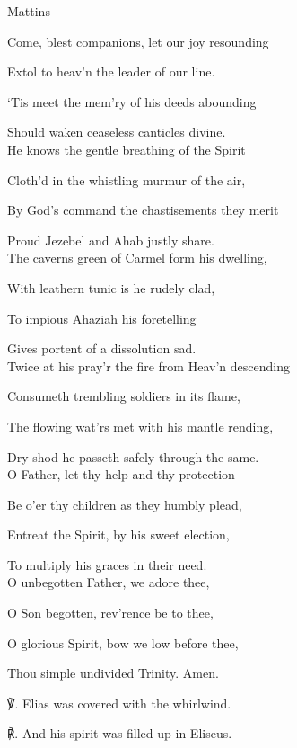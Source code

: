 \begin{paracol}{2}[]
\switchcolumn

\begin{inhead}
	Mattins
\end{inhead}
\begin{hangparas}{1.25em}{1}
Come, blest companions, let our joy resounding

Extol to heav'n the leader of our line.

`Tis meet the mem'ry of his deeds abounding

Should waken ceaseless canticles divine.\\

He knows the gentle breathing of the Spirit

Cloth'd in the whistling murmur of the air,

By God's command the chastisements they merit

Proud Jezebel and Ahab justly share.\\

The caverns green of Carmel form his dwelling,

With leathern tunic is he rudely clad,

To impious Ahaziah his foretelling

Gives portent of a dissolution sad.\\

Twice at his pray'r the fire from Heav'n descending

Consumeth trembling soldiers in its flame,

The flowing wat'rs met with his mantle rending,

Dry shod he passeth safely through the same.\\

O Father, let thy help and thy protection

Be o'er thy children as they humbly plead,

Entreat the Spirit, by his sweet election,

To multiply his graces in their need.\\

O unbegotten Father, we adore thee,

O Son begotten, rev'rence be to thee,

O glorious Spirit, bow we low before thee,

Thou simple undivided Trinity. Amen.\\
\end{hangparas}

    ℣. Elias was covered with the whirlwind.

	℟. And his spirit was filled up in Eliseus.

\par\noindent

\fussy
\end{paracol}

